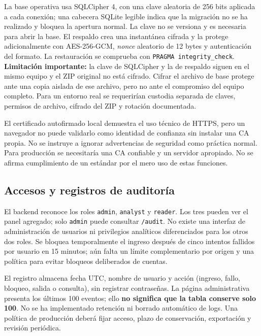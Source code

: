 \documentclass[12pt,a4paper]{article}
\begin{document}
La base operativa usa SQLCipher 4, con una clave aleatoria de 256 bits aplicada a cada conexión; una cabecera SQLite legible indica que la migración no se ha realizado y bloquea la apertura normal. La clave  no se versiona y es necesaria para abrir la base. El respaldo crea una instantánea cifrada y la protege adicionalmente con AES-256-GCM, \emph{nonce} aleatorio de 12 bytes y autenticación del formato. La restauración se comprueba con \texttt{PRAGMA integrity\_check}. \textbf{Limitación importante:} la clave de SQLCipher y la de respaldo siguen en el mismo equipo y el ZIP original no está cifrado. Cifrar el archivo de base protege ante una copia aislada de ese archivo, pero no ante el compromiso del equipo completo. Para un entorno real se requerirían custodia separada de claves, permisos de archivo, cifrado del ZIP y rotación documentada.

El certificado autofirmado local demuestra el uso técnico de HTTPS, pero un navegador no puede validarlo como identidad de confianza sin instalar una CA propia. No se instruye a ignorar advertencias de seguridad como práctica normal. Para producción se necesitaría una CA confiable y un servidor apropiado. No se afirma cumplimiento de un estándar por el mero uso de estas funciones.

\subsection{Accesos y registros de auditoría}
El backend reconoce los roles \texttt{admin}, \texttt{analyst} y \texttt{reader}. Los tres pueden ver el panel agregado; solo \texttt{admin} puede consultar \texttt{/audit}. No existe una interfaz de administración de usuarios ni privilegios analíticos diferenciados para los otros dos roles. Se bloquea temporalmente el ingreso después de cinco intentos fallidos por usuario en 15 minutos; aún falta un límite complementario por origen y una política para evitar bloqueos deliberados de cuentas.

El registro almacena fecha UTC, nombre de usuario y acción (ingreso, fallo, bloqueo, salida o consulta), sin registrar contraseñas. La página administrativa presenta los últimos 100 eventos; ello \textbf{no significa que la tabla conserve solo 100}. No se ha implementado retención ni borrado automático de logs. Una política de producción deberá fijar acceso, plazo de conservación, exportación y revisión periódica.
\end{document}

